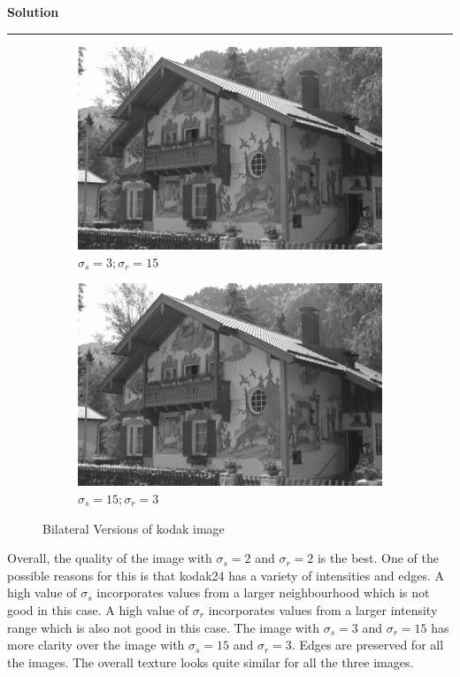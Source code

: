 \documentclass[a4paper,12pt]{article}
\newenvironment{solution}[2][]{%
    \begin{mdframed}[linecolor=green!60!black, linewidth=2pt, roundcorner=10pt, backgroundcolor=green!5!white, skipabove=12pt, skipbelow=12pt]%
        \textbf{\large #2} %
        \par\noindent\rule{\textwidth}{0.4pt} %
        \vspace{0.5em} %
}{%
    \end{mdframed}%
}
\begin{document}
\begin{solution}{Solution}
\begin{figure}[H]
\begin{subfigure}[b]{0.24\textwidth}
        \includegraphics[width=\textwidth]{../images/filtered_kodak24_bilateral_sigma_s_3_sigma_r_15.png}
        \caption{$\sigma_s=3;\sigma_r=15$}
        \label{fig:subfig3}
    \end{subfigure}
    \begin{subfigure}[b]{0.24\textwidth}
        \centering
        \includegraphics[width=\textwidth]{../images/filtered_kodak24_bilateral_sigma_s_15_sigma_r_3.png}
        \caption{$\sigma_s=15;\sigma_r=3$}
        \label{fig:subfig3}
    \end{subfigure}
    
    \caption{Bilateral Versions of kodak image }
    \label{fig:overall}
\end{figure}


Overall, the quality of the image with $\sigma_s=2$ and $\sigma_r=2$ is the best. One of the possible reasons for this is that kodak24 has a variety of intensities and edges. A high value of $\sigma_s$ incorporates values from a larger neighbourhood which is not good in this case. A high value of $\sigma_r$ incorporates values from a larger intensity range which is also not good in this case. The image with $\sigma_s=3$ and $\sigma_r=15$ has more clarity over the image with $\sigma_s=15$ and $\sigma_r=3$. Edges are preserved for all the images. The overall texture looks quite similar for all the three images. 


\end{solution}
\end{document}

